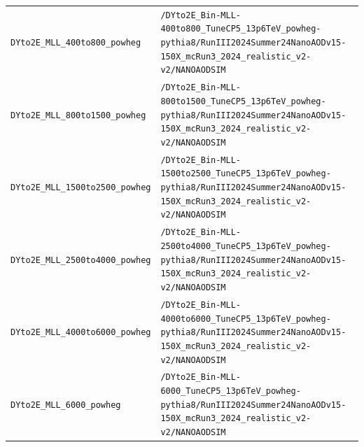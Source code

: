 \begin{longtable}{@{}>{\RaggedRight\arraybackslash}p{} >{\RaggedRight\arraybackslash}p{}@{}}
\addlinespace[2pt]
\texttt{DYto2E\_\allowbreak{}MLL\_\allowbreak{}400to800\_\allowbreak{}powheg} & \texttt{/\allowbreak{}DYto2E\_\allowbreak{}Bin-\allowbreak{}MLL-\allowbreak{}400to800\_\allowbreak{}TuneCP5\_\allowbreak{}13p6TeV\_\allowbreak{}powheg-\allowbreak{}pythia8/\allowbreak{}RunIII2024Summer24NanoAODv15-\allowbreak{}150X\_\allowbreak{}mcRun3\_\allowbreak{}2024\_\allowbreak{}realistic\_\allowbreak{}v2-\allowbreak{}v2/\allowbreak{}NANOAODSIM} \\
\addlinespace[2pt]
\texttt{DYto2E\_\allowbreak{}MLL\_\allowbreak{}800to1500\_\allowbreak{}powheg} & \texttt{/\allowbreak{}DYto2E\_\allowbreak{}Bin-\allowbreak{}MLL-\allowbreak{}800to1500\_\allowbreak{}TuneCP5\_\allowbreak{}13p6TeV\_\allowbreak{}powheg-\allowbreak{}pythia8/\allowbreak{}RunIII2024Summer24NanoAODv15-\allowbreak{}150X\_\allowbreak{}mcRun3\_\allowbreak{}2024\_\allowbreak{}realistic\_\allowbreak{}v2-\allowbreak{}v2/\allowbreak{}NANOAODSIM} \\
\addlinespace[2pt]
\texttt{DYto2E\_\allowbreak{}MLL\_\allowbreak{}1500to2500\_\allowbreak{}powheg} & \texttt{/\allowbreak{}DYto2E\_\allowbreak{}Bin-\allowbreak{}MLL-\allowbreak{}1500to2500\_\allowbreak{}TuneCP5\_\allowbreak{}13p6TeV\_\allowbreak{}powheg-\allowbreak{}pythia8/\allowbreak{}RunIII2024Summer24NanoAODv15-\allowbreak{}150X\_\allowbreak{}mcRun3\_\allowbreak{}2024\_\allowbreak{}realistic\_\allowbreak{}v2-\allowbreak{}v2/\allowbreak{}NANOAODSIM} \\
\addlinespace[2pt]
\texttt{DYto2E\_\allowbreak{}MLL\_\allowbreak{}2500to4000\_\allowbreak{}powheg} & \texttt{/\allowbreak{}DYto2E\_\allowbreak{}Bin-\allowbreak{}MLL-\allowbreak{}2500to4000\_\allowbreak{}TuneCP5\_\allowbreak{}13p6TeV\_\allowbreak{}powheg-\allowbreak{}pythia8/\allowbreak{}RunIII2024Summer24NanoAODv15-\allowbreak{}150X\_\allowbreak{}mcRun3\_\allowbreak{}2024\_\allowbreak{}realistic\_\allowbreak{}v2-\allowbreak{}v2/\allowbreak{}NANOAODSIM} \\
\addlinespace[2pt]
\texttt{DYto2E\_\allowbreak{}MLL\_\allowbreak{}4000to6000\_\allowbreak{}powheg} & \texttt{/\allowbreak{}DYto2E\_\allowbreak{}Bin-\allowbreak{}MLL-\allowbreak{}4000to6000\_\allowbreak{}TuneCP5\_\allowbreak{}13p6TeV\_\allowbreak{}powheg-\allowbreak{}pythia8/\allowbreak{}RunIII2024Summer24NanoAODv15-\allowbreak{}150X\_\allowbreak{}mcRun3\_\allowbreak{}2024\_\allowbreak{}realistic\_\allowbreak{}v2-\allowbreak{}v2/\allowbreak{}NANOAODSIM} \\
\addlinespace[2pt]
\texttt{DYto2E\_\allowbreak{}MLL\_\allowbreak{}6000\_\allowbreak{}powheg} & \texttt{/\allowbreak{}DYto2E\_\allowbreak{}Bin-\allowbreak{}MLL-\allowbreak{}6000\_\allowbreak{}TuneCP5\_\allowbreak{}13p6TeV\_\allowbreak{}powheg-\allowbreak{}pythia8/\allowbreak{}RunIII2024Summer24NanoAODv15-\allowbreak{}150X\_\allowbreak{}mcRun3\_\allowbreak{}2024\_\allowbreak{}realistic\_\allowbreak{}v2-\allowbreak{}v2/\allowbreak{}NANOAODSIM} \\

\end{longtable}
